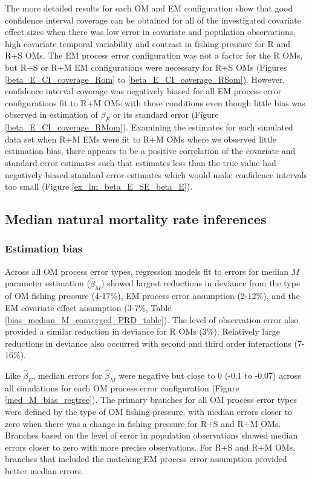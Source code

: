 \documentclass[
  12pt,
]{article}
\begin{document}
The more detailed results for each OM and EM configuration show that good confidence interval coverage can be obtained for all of the investigated covariate effect sizes when there was low error in covariate and population observations, high covariate temporal variability and contrast in fishing pressure for R and R+S OMs. The EM process error configuration was not a factor for the R OMs, but R+S or R+M EM configurations were necessary for R+S OMs (Figures \ref{beta_E_CI_coverage_Rom} to \ref{beta_E_CI_coverage_RSom}). However, confidence interval coverage was negatively biased for all EM process error configurations fit to R+M OMs with these conditions even though little bias was observed in estimation of \(\beta_E\) or its standard error (Figure \ref{beta_E_CI_coverage_RMom}). Examining the estimates for each simulated data set when R+M EMs were fit to R+M OMs where we observed little estimation bias, there appears to be a positive correlation of the covariate and standard error estimates such that estimates less than the true value had negatively biased standard error estimates which would make confidence intervals too small (Figure \ref{ex_lm_beta_E_SE_beta_E}).

\subsection*{Median natural mortality rate inferences}\label{median-natural-mortality-rate-inferences}

\subsubsection*{Estimation bias}\label{estimation-bias-1}

Across all OM process error types, regression models fit to errors for median \(M\) parameter estimation (\(\widehat \beta_M\)) showed largest reductions in deviance from the type of OM fishing pressure (4-17\%), EM process error assumption (2-12\%), and the EM covariate effect assumption (3-7\%, Table \ref{bias_median_M_converged_PRD_table}). The level of observation error also provided a similar reduction in deviance for R OMs (3\%). Relatively large reductions in deviance also occurred with second and third order interactions (7-16\%).

Like \(\widehat \beta_E\), median errors for \(\widehat \beta_M\) were negative but close to 0 (-0.1 to -0.07) across all simulations for each OM process error configuration (Figure \ref{med_M_bias_regtree}). The primary branches for all OM process error types were defined by the type of OM fishing pressure, with median errors closer to zero when there was a change in fishing pressure for R+S and R+M OMs. Branches based on the level of error in population observations showed median errors closer to zero with more precise observations. For R+S and R+M OMs, branches that included the matching EM process error assumption provided better median errors.
\end{document}
